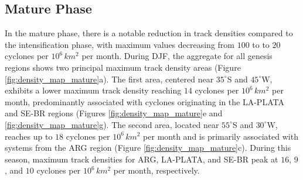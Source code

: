 \subsection{Mature Phase}\label{sec:mature_phase}

In the mature phase, there is a notable reduction in track densities compared to the intensification phase, with maximum values decreasing from \(100\) to to \(20\) cyclones per \(10^6 \, km^2\) per month. During DJF, the aggregate for all genesis regions shows two principal maximum track density areas (Figure \ref{fig:density_map_mature}a). The first area, centered near \(35^\circ\)S and \(45^\circ\)W, exhibits a lower maximum track density reaching \(14\) cyclones per \(10^6 \, km^2\) per month, predominantly associated with cyclones originating in the LA-PLATA and SE-BR regions (Figures \ref{fig:density_map_mature}e and \ref{fig:density_map_mature}g). The second area, located near \(55^\circ\)S and \(30^\circ\)W, reaches up to \(18\) cyclones per \(10^6 \, km^2\) per month and is primarily associated with systems from the ARG region (Figure \ref{fig:density_map_mature}c). During this season, maximum track densities for ARG, LA-PLATA, and SE-BR peak at \(16\), \(9\), and \(10\) cyclones per \(10^6 \, km^2\) per month, respectively.

